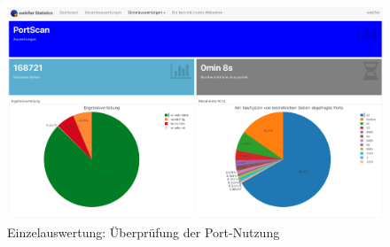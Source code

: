 \begin{landscape}
\begin{figure}[H]
  \centering
  \includegraphics[width=\textheight]{images/stats/portscan}
  \caption{Einzelauswertung: Überprüfung der Port-Nutzung}
\end{figure}

\end{landscape}
